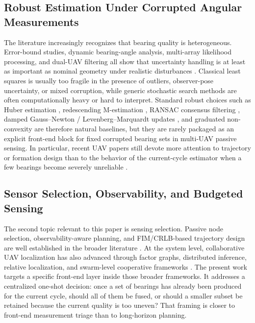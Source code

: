 \documentclass[drones,article,submit,pdftex,moreauthors]{Definitions/mdpi}
\begin{document}
\subsection{Robust Estimation Under Corrupted Angular Measurements}

The literature increasingly recognizes that bearing quality is heterogeneous. Error-bound studies, dynamic bearing-angle analysis, multi-array likelihood processing, and dual-UAV filtering all show that uncertainty handling is at least as important as nominal geometry under realistic disturbances \cite{chen2025error,luo2025dynamicbearing,hu2025cyclic,yin2025dual}. Classical least squares is usually too fragile in the presence of outliers, observer-pose uncertainty, or mixed corruption, while generic stochastic search methods are often computationally heavy or hard to interpret. Standard robust choices such as Huber estimation \cite{huber1964robust}, redescending M-estimation \cite{beaton1974fitting}, RANSAC consensus filtering \cite{fischler1981ransac}, damped Gauss--Newton / Levenberg--Marquardt updates \cite{levenberg1944method,marquardt1963algorithm}, and graduated non-convexity \cite{yang2020gnc} are therefore natural baselines, but they are rarely packaged as an explicit front-end block for fixed corrupted bearing sets in multi-UAV passive sensing. In particular, recent UAV papers still devote more attention to trajectory or formation design than to the behavior of the current-cycle estimator when a few bearings become severely unreliable \cite{li2025bearing,huang2025emcompat,zhou2026target}.

\subsection{Sensor Selection, Observability, and Budgeted Sensing}

The second topic relevant to this paper is sensing selection. Passive node selection, observability-aware planning, and FIM/CRLB-based trajectory design are well established in the broader literature \cite{xing2025node,chen2025variable,wang2025bio,zou2024revisit,dogancay2024bayesian,peng2024trajectory}. At the system level, collaborative UAV localization has also advanced through factor graphs, distributed inference, relative localization, and swarm-level cooperative frameworks \cite{yang2020tightly,yang2024distributed,qian2025cooperative,li2025tcdrl,li2026formation,ding2026set,zhang2026multi}. The present work targets a specific front-end layer inside those broader frameworks. It addresses a centralized one-shot decision: once a set of bearings has already been produced for the current cycle, should all of them be fused, or should a smaller subset be retained because the current quality is too uneven? That framing is closer to front-end measurement triage than to long-horizon planning.
\end{document}
